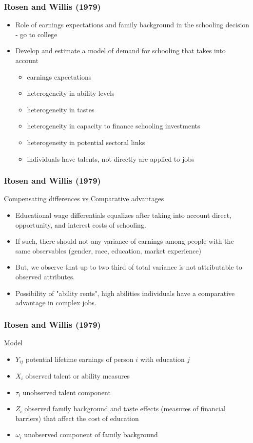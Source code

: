 \documentclass{beamer}
\newcommand{\1}{\mathbb{1}}
\begin{document}
\begin{frame}\frametitle{Rosen and Willis (1979)}
\begin{itemize}
\item Role of earnings expectations and family background in the schooling decision - go to college
\item Develop and estimate a model of demand for schooling that takes into account
\begin{itemize}
\item earnings expectations
\item heterogeneity in ability levels 
\item heterogeneity in tastes
\item heterogeneity in capacity to finance schooling investments
\item heterogeneity in potential sectoral links
\item individuals have talents, not directly are applied to jobs
\end{itemize}
\end{itemize}
\end{frame}

\begin{frame}\frametitle{Rosen and Willis (1979)}
Compensating differences vs Comparative advantages
\begin{itemize}
\item Educational wage differentials equalizes after taking into account direct, opportunity, and interest costs of schooling. 
\item If such, there should not any variance of earnings among people with the same observables (gender, race, education, market experience)
\item But, we observe that up to two third of total variance is not attributable to observed attributes. 
\item Possibility of "ability rents", high abilities individuals have a comparative advantage in complex jobs. 
\end{itemize}
\end{frame}

\begin{frame}\frametitle{Rosen and Willis (1979)}
Model
\begin{itemize}
\item $Y_{ij}$ potential lifetime earnings of person $i$ with education $j$
\item $X_i$ observed talent or ability measures
\item $\tau_i$ unobserved talent component
\item $Z_i$ observed family background and taste effects (measures of financial barriers) that affect the cost of education
\item $\omega_i$ unobserved component of family background
\end{itemize}
\end{frame}
\end{document}
